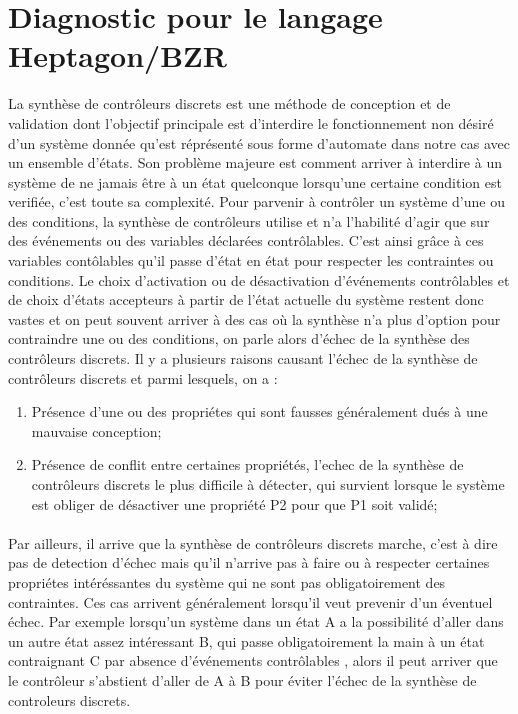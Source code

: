 \documentclass{svjour3}
\begin{document}
\section{Diagnostic pour le langage Heptagon/BZR}
\label{sec:1}
La synthèse de contrôleurs discrets est une méthode de conception et de validation dont l'objectif principale est d'interdire le fonctionnement non 
désiré d'un système donnée qu'est réprésenté sous forme d'automate dans notre cas avec un ensemble d'états. Son problème majeure est comment 
arriver à interdire à un système de ne jamais être à un état quelconque lorsqu'une certaine condition est verifiée, c'est toute sa complexité. 
Pour parvenir à contrôler un système d'une ou des conditions, la synthèse de contrôleurs utilise et n'a 
l'habilité d'agir que sur des événements ou des variables déclarées contrôlables. C'est ainsi grâce à ces variables contôlables qu'il passe d'état
en état pour respecter
les contraintes ou conditions. Le choix d'activation ou de désactivation d'événements contrôlables et de choix d'états accepteurs à partir de l'état actuelle du système restent
donc vastes et on peut souvent arriver à des cas où la  synthèse n'a plus d'option pour contraindre une ou des conditions, on parle alors d'échec de la 
synthèse des contrôleurs discrets. Il y a plusieurs raisons causant l'échec de la synthèse de contrôleurs discrets et parmi lesquels, on a :
\begin{enumerate}
 \item Présence d'une ou des propriétes qui sont fausses généralement dués à une mauvaise conception;
 \item Présence de conflit entre certaines propriétés, l'echec de la synthèse de contrôleurs discrets le plus difficile à détecter,
 qui survient lorsque le système est obliger de désactiver une propriété P2 pour que P1 soit validé;
\end{enumerate}
\label{sec:2}
\paragraph{}
Par ailleurs, il arrive que la synthèse de contrôleurs discrets marche, c'est à dire pas de detection d'échec mais qu'il n'arrive pas à faire ou à respecter
certaines propriétes intéréssantes du système qui ne sont pas obligatoirement des contraintes. Ces cas arrivent généralement lorsqu'il veut prevenir d'un 
éventuel échec. Par exemple lorsqu'un système dans un état A a la possibilité d'aller dans un autre état assez intéressant B, qui passe obligatoirement
la main à un état contraignant C par absence d'événements contrôlables , alors il peut arriver que le contrôleur s'abstient d'aller de A à B pour éviter l'échec de
la synthèse de controleurs discrets.
\end{document}
